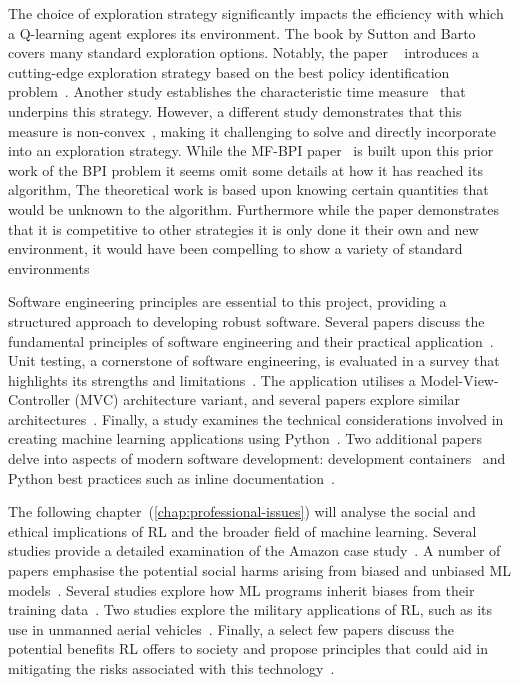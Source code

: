 \documentclass[]{final_report}
\begin{document}
The choice of exploration strategy significantly impacts the efficiency with which a Q-learning agent explores its environment. The book by Sutton and Barto~\cite{sutton2018reinforcement} covers many standard exploration options. Notably, the paper ~\cite{modelFree} introduces a cutting-edge exploration strategy based on the best policy identification problem~\cite{bestPolicyIdentifaction}. Another study establishes the characteristic time measure~\cite{characteristicTime} that underpins this strategy. However, a different study demonstrates that this measure is non-convex~\cite{characteristicTimeNonConvex}, making it challenging to solve and directly incorporate into an exploration strategy. While the MF-BPI paper~\cite{modelFree} is built upon this prior work of the BPI problem it seems omit some details at how it has reached its algorithm, The theoretical work is based upon knowing certain quantities that would be unknown to the algorithm. Furthermore while the paper demonstrates that it is competitive to other strategies it is only done it their own and new  environment, it would have been compelling to show a variety of standard environments

Software engineering principles are essential to this project, providing a structured approach to developing robust software. Several papers discuss the fundamental principles of software engineering and their practical application~\cite{softwareEngineringPrinciples,van2008software}. Unit testing, a cornerstone of software engineering, is evaluated in a survey that highlights its strengths and limitations~\cite{unitTestingSurvey}. The application utilises a Model-View-Controller (MVC) architecture variant, and several papers explore similar architectures~\cite{webMVC, mvvm, gamesMVC}. Finally, a study examines the technical considerations involved in creating machine learning applications using Python~\cite{pythonMachineLearning}. Two additional papers delve into aspects of modern software development: development containers~\cite{developmentContainers} and Python best practices such as inline documentation~\cite{pythonAutoDoc}.

The following chapter~(\ref{chap:professional-issues}) will analyse the social and ethical implications of RL and the broader field of machine learning. Several studies provide a detailed examination of the Amazon  case study~\cite{facialRecognitionBias, legislatingRekognition, legislatingOG, rekognitionOverview}. A number of papers emphasise the potential social harms arising from biased and unbiased ML models~\cite{AISocialImpactAndAccountability,facialRecognitionBias, anprAccountability}. Several studies explore how ML programs inherit biases from their training data~\cite{LLMSocialEthicalRisks, AISocialImpactAndAccountability, facialRecognitionBias}. Two studies explore the military applications of RL, such as its use in unmanned aerial vehicles~\cite{rlMilitaryReviewChina, DRLDrones}. Finally, a select few papers discuss the potential benefits RL offers to society and propose principles that could aid in mitigating the risks associated with this technology~\cite{AIRisksAndPrinciples,deepRLsocietalImpact, ransbotham2017reshaping}.
\end{document}
